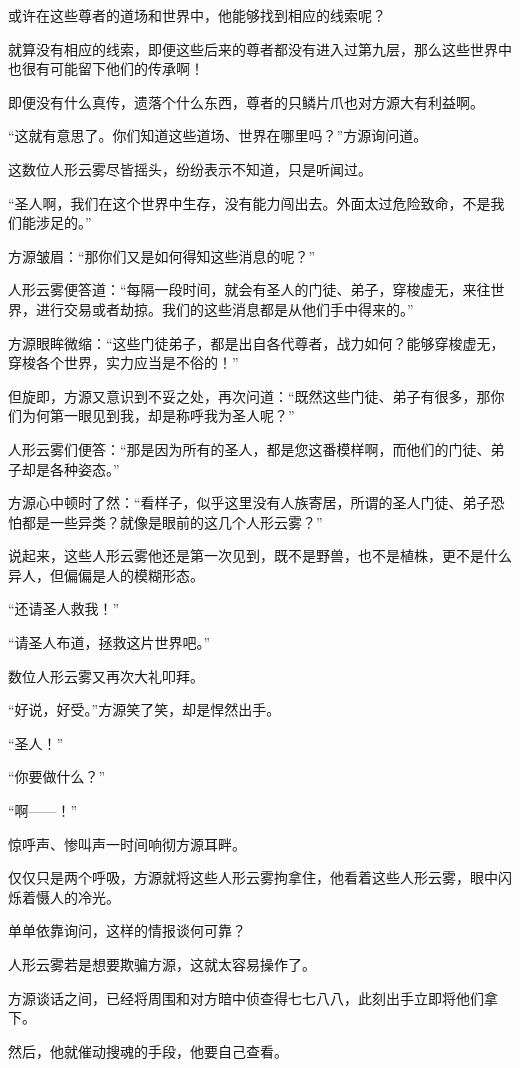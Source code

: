 \begin{this_body}
或许在这些尊者的道场和世界中，他能够找到相应的线索呢？

就算没有相应的线索，即便这些后来的尊者都没有进入过第九层，那么这些世界中也很有可能留下他们的传承啊！

即便没有什么真传，遗落个什么东西，尊者的只鳞片爪也对方源大有利益啊。

“这就有意思了。你们知道这些道场、世界在哪里吗？”方源询问道。

这数位人形云雾尽皆摇头，纷纷表示不知道，只是听闻过。

“圣人啊，我们在这个世界中生存，没有能力闯出去。外面太过危险致命，不是我们能涉足的。”

方源皱眉：“那你们又是如何得知这些消息的呢？”

人形云雾便答道：“每隔一段时间，就会有圣人的门徒、弟子，穿梭虚无，来往世界，进行交易或者劫掠。我们的这些消息都是从他们手中得来的。”

方源眼眸微缩：“这些门徒弟子，都是出自各代尊者，战力如何？能够穿梭虚无，穿梭各个世界，实力应当是不俗的！”

但旋即，方源又意识到不妥之处，再次问道：“既然这些门徒、弟子有很多，那你们为何第一眼见到我，却是称呼我为圣人呢？”

人形云雾们便答：“那是因为所有的圣人，都是您这番模样啊，而他们的门徒、弟子却是各种姿态。”

方源心中顿时了然：“看样子，似乎这里没有人族寄居，所谓的圣人门徒、弟子恐怕都是一些异类？就像是眼前的这几个人形云雾？”

说起来，这些人形云雾他还是第一次见到，既不是野兽，也不是植株，更不是什么异人，但偏偏是人的模糊形态。

“还请圣人救我！”

“请圣人布道，拯救这片世界吧。”

数位人形云雾又再次大礼叩拜。

“好说，好受。”方源笑了笑，却是悍然出手。

“圣人！”

“你要做什么？”

“啊——！”

惊呼声、惨叫声一时间响彻方源耳畔。

仅仅只是两个呼吸，方源就将这些人形云雾拘拿住，他看着这些人形云雾，眼中闪烁着慑人的冷光。

单单依靠询问，这样的情报谈何可靠？

人形云雾若是想要欺骗方源，这就太容易操作了。

方源谈话之间，已经将周围和对方暗中侦查得七七八八，此刻出手立即将他们拿下。

然后，他就催动搜魂的手段，他要自己查看。


\end{this_body}
